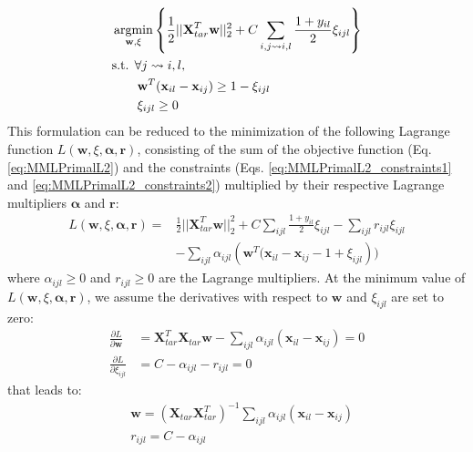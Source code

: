 \begin{align}
	&\displaystyle 		\argmin_{\textbf{w},\xi}
	\left\lbrace \frac{1}{2}||\textbf{X}_{tar}^T \textbf{w}||_2^2						
	+					
	C\sum\limits_{i,j \rightsquigarrow i,l} \frac{1+y_{il}}{2} \xi_{ijl}
	\right\rbrace  \label{eq:MMLPrimalL2} \\
	&\text{s.t.  } \forall j \rightsquigarrow i, l, \nonumber \\
	& \qquad \textbf{w}^T(\textbf{x}_{il}-\textbf{x}_{ij}) \geq 1-\xi_{ijl} \label{eq:MMLPrimalL2_constraints1} \\
	& \qquad \xi_{ijl} \geq 0 \label{eq:MMLPrimalL2_constraints2}
\end{align}
This formulation can be reduced to the minimization of the following Lagrange function $L(\textbf{w},\xi,\boldsymbol{\alpha},\textbf{r})$, consisting of the sum of the objective function (Eq. \ref{eq:MMLPrimalL2}) and the constraints (Eqs. \ref{eq:MMLPrimalL2_constraints1} and \ref{eq:MMLPrimalL2_constraints2}) multiplied by their respective Lagrange multipliers $\boldsymbol{\alpha}$ and $\textbf{r}$:
\begin{equation}
\begin{aligned}
	L(\textbf{w},\xi,\boldsymbol{\alpha},\textbf{r}) 
	= & 
	\frac{1}{2}||\textbf{X}_{tar}^T \textbf{w}||_2^2
	+ C \sum\limits_{ijl} \frac{1+y_{il}}{2} \xi_{ijl} - \sum\limits_{ijl}r_{ijl} \xi_{ijl} \\
	&  - \sum\limits_{ijl} \alpha_{ijl}\left( \textbf{w}^T(\textbf{x}_{il}-\textbf{x}_{ij}-1+\xi_{ijl} \right))
	\label{eq:OptimizationDual}
\end{aligned}
\end{equation}
\noindent where $\alpha_{ijl} \geq 0$ and $r_{ijl} \geq 0$ are the Lagrange multipliers. At the minimum value of $L(\textbf{w},\xi,\boldsymbol{\alpha},\textbf{r})$, we assume the derivatives with respect to $\textbf{w}$ and $\xi_{ijl}$ are set to zero:
\begin{align*}
\frac{\partial L}{\partial \textbf{w}} 
& = 
\textbf{X}_{tar}^T \textbf{X}_{tar} \textbf{w} 
- \sum\limits_{ijl} \alpha_{ijl}(\textbf{x}_{il}-\textbf{x}_{ij}) 
= 0 \\
\frac{\partial L}{\partial \xi_{ijl}} & = C - \alpha_{ijl} - r_{ijl} = 0
\end{align*}
\noindent that leads to:
\begin{align}
& \textbf{w} = (\textbf{X}_{tar} \textbf{X}_{tar}^T)^{-1}  
\sum\limits_{ijl} \alpha_{ijl}(\textbf{x}_{il}-\textbf{x}_{ij}) \label{Eq:eqn_w} 
\\ 
& r_{ijl} = C - \alpha_{ijl} \label{Eq:eqn_w2}
\end{align}

